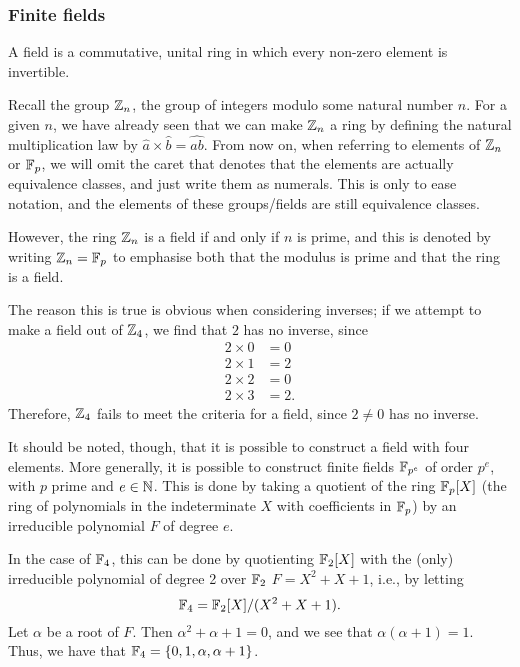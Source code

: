 \subsubsection{Finite fields}
\begin{definition}
	A field is a commutative, unital ring in which every non-zero element is invertible.\cite{322-lectures}
\end{definition}
Recall the group $\zn$, the group of integers modulo some natural number $n$.
For a given $n$, we have already seen that we can make $\zn$ a ring by defining the natural multiplication law by $\widehat{a} \times \widehat{b} = \widehat{ab}$.
From now on, when referring to elements of $\zn$ or $\fp$, we will omit the caret that denotes that the elements are actually equivalence classes, and just write them as numerals.
This is only to ease notation, and the elements of these groups/fields are still equivalence classes.

However, the ring $\zn$ is a field if and only if $n$ is prime, and this is denoted by writing $\zn = \fp$ to emphasise both that the modulus is prime and that the ring is a field.

The reason this is true is obvious when considering inverses; if we attempt to make a field out of $\zn[4]$, we find that $2$ has no inverse, since
\begin{align*}
	2 \times 0 &= 0\\
	2 \times 1 &= 2\\
	2 \times 2 &= 0\\
	2 \times 3 &= 2.
\end{align*}
Therefore, $\zn[4]$ fails to meet the criteria for a field, since $2\neq 0$ has no inverse.

It should be noted, though, that it is possible to construct a field with four elements.
More generally, it is possible to construct finite fields $\fp[p^e]$ of order $p^e$, with $p$ prime and $e \in \N$.
This is done by taking a quotient of the ring $\fp[p] [X]$ (the ring of polynomials in the indeterminate $X$ with coefficients in $\fp$) by an irreducible polynomial $F$ of degree $e$.

In the case of $\fp[4]$, this can be done by quotienting $\fp[2] [X]$ with the (only) irreducible polynomial of degree 2 over $\fp[2]$ $F = X^2+X+1$, i.e., by letting
$$\fp[4] = \fp[2] [X] / (X^2 + X + 1).$$
Let $\alpha$ be a root of $F$.
Then $\alpha^2 + \alpha + 1 = 0$, and we see that $\alpha(\alpha +1) = 1$.
Thus, we have that $\fp[4] = \{0, 1, \alpha, \alpha + 1\}$.

